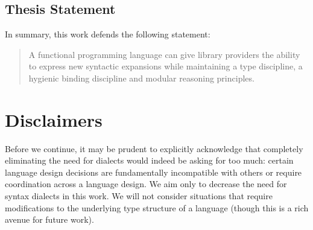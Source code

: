 

\subsection*{Thesis Statement}
In summary, this work defends the following statement:

\begin{quote}
A functional programming language can give library providers the ability to %
express new syntactic expansions while maintaining a type discipline, a hygienic binding discipline and modular reasoning principles. %
\end{quote}
\section{Disclaimers}
Before we continue, it may be prudent to explicitly acknowledge that completely eliminating the need for dialects would indeed be asking for too much: certain language design decisions are fundamentally incompatible with others or require coordination across a language design. We aim only to decrease the need for syntax dialects in this work. We will not consider situations that require modifications to the underlying type structure of a language (though this is a rich avenue for future work). %

